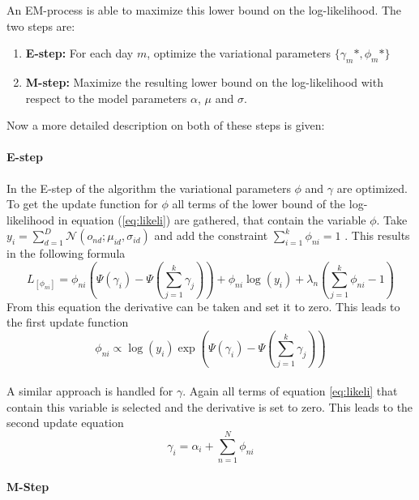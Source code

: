 An EM-process is able to maximize this lower bound on the log-likelihood. The two steps are:
  \begin{enumerate}
   \item \textbf{E-step:} For each day $m$, optimize the variational parameters $\{ \gamma_{m}*,\phi_{m}* \}$
   \item \textbf{M-step:} Maximize the resulting lower bound on the log-likelihood with respect to the model parameters $\alpha$, $\mu$ and $\sigma$.
  \end{enumerate}
  
  Now a more detailed description on both of these steps is given:
  
  \paragraph{E-step}
In the E-step of the algorithm the variational parameters $\phi$ and $\gamma$ are optimized. To get the update function for $\phi$ all terms of the lower bound of the log-likelihood in equation (\ref{eq:likeli}) are gathered, that contain the variable $\phi$. 
Take $y_i=\sum_{d=1}^D \mathcal{N}(o_{nd};\mu_{id},\sigma_{id})$ and add the constraint $\sum_{i=1}^k \phi_{ni}=1 $ . This results in the following formula
\begin{equation}
 L_{[\phi_{ni}]} = \phi_{ni}(\Psi(\gamma_i)-\Psi(\sum_{j=1}^k \gamma_j)) + \phi_{ni} \log(y_i) + \lambda_n(\sum_{j=1}^k \phi_{ni} -1)
\end{equation}
From this equation the derivative can be taken and set it to zero. This leads to the first update function
\begin{equation}
 \phi_{ni} \propto \log(y_i) \exp(\Psi(\gamma_i) - \Psi(\sum_{j=1}^k \gamma_j))
\end{equation}
\\

A similar approach is handled for $\gamma$. Again all terms of equation \ref{eq:likeli} that contain this variable is selected and the derivative is set to zero. This leads to the second update equation
\begin{equation}
 \gamma_i = \alpha_i + \sum_{n=1}^N \phi_{ni}
\end{equation}


  \paragraph{M-Step}
  
